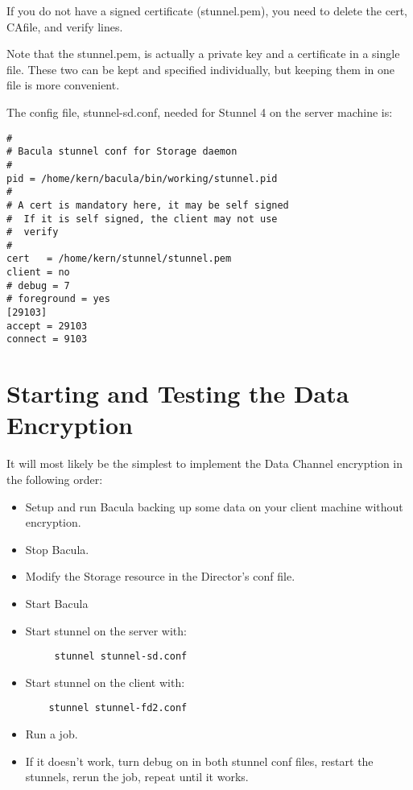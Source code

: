 If you do not have a signed certificate (stunnel.pem), you need to delete the
cert, CAfile, and verify lines.

Note that the stunnel.pem, is actually a private key and a certificate in a
single file. These two can be kept and specified individually, but keeping
them in one file is more convenient.

The config file, stunnel-sd.conf, needed for Stunnel 4 on the server machine
is:

\footnotesize
\begin{verbatim}
#
# Bacula stunnel conf for Storage daemon
#
pid = /home/kern/bacula/bin/working/stunnel.pid
#
# A cert is mandatory here, it may be self signed
#  If it is self signed, the client may not use
#  verify
#
cert   = /home/kern/stunnel/stunnel.pem
client = no
# debug = 7
# foreground = yes
[29103]
accept = 29103
connect = 9103
\end{verbatim}
\normalsize

\section{Starting and Testing the Data Encryption}

It will most likely be the simplest to implement the Data Channel encryption
in the following order:

\begin{itemize}
\item Setup and run Bacula backing up some data on your  client machine
   without encryption.
\item Stop Bacula.
\item Modify the Storage resource in the Director's conf  file.
\item Start Bacula
\item Start stunnel on the server with:

   \footnotesize
\begin{verbatim}
     stunnel stunnel-sd.conf

\end{verbatim}
\normalsize

\item Start stunnel on the client with:

   \footnotesize
\begin{verbatim}
    stunnel stunnel-fd2.conf

\end{verbatim}
\normalsize

\item Run a job.
\item If it doesn't work, turn debug on in both stunnel conf files,  restart
   the stunnels, rerun the job, repeat until it works.
   \end{itemize}

